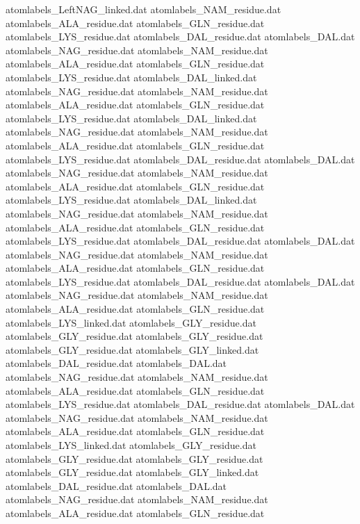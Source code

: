 atomlabels_LeftNAG_linked.dat   
atomlabels_NAM_residue.dat      
atomlabels_ALA_residue.dat      
atomlabels_GLN_residue.dat      
atomlabels_LYS_residue.dat      
atomlabels_DAL_residue.dat      
atomlabels_DAL.dat              
atomlabels_NAG_residue.dat      
atomlabels_NAM_residue.dat      
atomlabels_ALA_residue.dat      
atomlabels_GLN_residue.dat      
atomlabels_LYS_residue.dat      
atomlabels_DAL_linked.dat       
atomlabels_NAG_residue.dat      
atomlabels_NAM_residue.dat      
atomlabels_ALA_residue.dat      
atomlabels_GLN_residue.dat      
atomlabels_LYS_residue.dat      
atomlabels_DAL_linked.dat       
atomlabels_NAG_residue.dat      
atomlabels_NAM_residue.dat      
atomlabels_ALA_residue.dat      
atomlabels_GLN_residue.dat      
atomlabels_LYS_residue.dat      
atomlabels_DAL_residue.dat      
atomlabels_DAL.dat              
atomlabels_NAG_residue.dat      
atomlabels_NAM_residue.dat      
atomlabels_ALA_residue.dat      
atomlabels_GLN_residue.dat      
atomlabels_LYS_residue.dat      
atomlabels_DAL_linked.dat       
atomlabels_NAG_residue.dat      
atomlabels_NAM_residue.dat      
atomlabels_ALA_residue.dat      
atomlabels_GLN_residue.dat      
atomlabels_LYS_residue.dat      
atomlabels_DAL_residue.dat      
atomlabels_DAL.dat              
atomlabels_NAG_residue.dat      
atomlabels_NAM_residue.dat      
atomlabels_ALA_residue.dat      
atomlabels_GLN_residue.dat      
atomlabels_LYS_residue.dat      
atomlabels_DAL_residue.dat      
atomlabels_DAL.dat              
atomlabels_NAG_residue.dat      
atomlabels_NAM_residue.dat      
atomlabels_ALA_residue.dat      
atomlabels_GLN_residue.dat      
atomlabels_LYS_linked.dat       
atomlabels_GLY_residue.dat
atomlabels_GLY_residue.dat
atomlabels_GLY_residue.dat
atomlabels_GLY_residue.dat
atomlabels_GLY_linked.dat
atomlabels_DAL_residue.dat      
atomlabels_DAL.dat              
atomlabels_NAG_residue.dat      
atomlabels_NAM_residue.dat      
atomlabels_ALA_residue.dat      
atomlabels_GLN_residue.dat      
atomlabels_LYS_residue.dat      
atomlabels_DAL_residue.dat      
atomlabels_DAL.dat              
atomlabels_NAG_residue.dat      
atomlabels_NAM_residue.dat      
atomlabels_ALA_residue.dat      
atomlabels_GLN_residue.dat      
atomlabels_LYS_linked.dat       
atomlabels_GLY_residue.dat
atomlabels_GLY_residue.dat
atomlabels_GLY_residue.dat
atomlabels_GLY_residue.dat
atomlabels_GLY_linked.dat
atomlabels_DAL_residue.dat      
atomlabels_DAL.dat              
atomlabels_NAG_residue.dat      
atomlabels_NAM_residue.dat      
atomlabels_ALA_residue.dat      
atomlabels_GLN_residue.dat      
